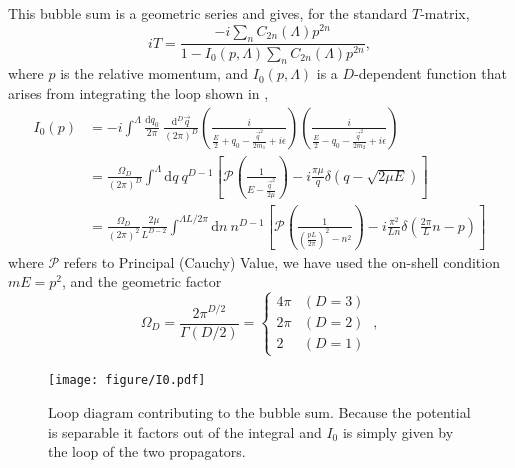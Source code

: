 This bubble sum is a geometric series and gives, for the standard $T$-matrix, \cite{Kaplan:1998we,Beane:2003da}
\begin{equation}\label{eq:T matrix}
iT = \frac{-i\sum_n C_{2n}(\Lambda) p^{2n}}{1-I_0(p,\Lambda) \sum_n C_{2n}(\Lambda) p^{2n}},
\end{equation}
where $p$ is the relative momentum,  and $I_0(p,\Lambda)$ is a $D$-dependent function that arises from integrating the loop shown in ,
\begin{align}
    I_0(p)
    &=-i\int^{\Lambda}
        \frac { \mathrm {d}q_0}{2\pi}\ \frac{\mathrm { d } ^ { D } \vec{ q } } { (2\pi)^ { D } }
        \left( \frac { i } { \frac{E}{2} + q _ { 0 } - \frac{\vec{q}^2}{2m_1} + i \epsilon } \right)
        \left( \frac { i } { \frac{E}{2} - q _ { 0 } - \frac{\vec{q}^2}{2m_2} + i \epsilon } \right)
    \label{eq:I0 in two particle language}\\
    &=\frac{\Omega_D}{(2\pi)^D}\int^{\Lambda}  \mathrm { d } q \ q^{D-1}\left[\mathcal{P} \left( \frac { 1 } { E - \frac{\vec{q}^2}{2\mu} } \right)
-i\frac{\pi \mu}{q}\delta(q-\sqrt{2 \mu E})\right]
    \\
    &=\frac{\Omega_D}{(2\pi)^2}\frac{2\mu}{L^{D-2}}\int^{\Lambda L/2\pi}  \mathrm { d } n \ n^{D-1}\left[\mathcal{P} \left( \frac { 1 } { \left(\frac{pL}{2\pi}\right)^2 - n^2 } \right)
-i\frac{\pi^2}{L n}\delta\left(\frac{2\pi}{L}n -p\right)\right]
    \label{eq:I0}
\end{align}
where $\mathcal{P}$ refers to Principal (Cauchy) Value, we have used the on-shell condition $mE=p^2$, and the geometric factor
\begin{equation}
\Omega_D=\frac{2\pi^{D/2}}{\Gamma(D/2)}=
    \begin{cases}
        4\pi    &   (D=3)\\
        2\pi    &   (D=2)\\
        2       &   (D=1)
    \end{cases}\ ,
\end{equation}

\begin{figure}[h!]
    \center
    \texttt{[image: figure/I0.pdf]}
    \caption{
        Loop diagram contributing to the bubble sum.
        Because the potential is separable it factors out of the integral and $I_0$ is simply given by the loop of the two propagators.
    }
    \label{fig:I0}
\end{figure}

